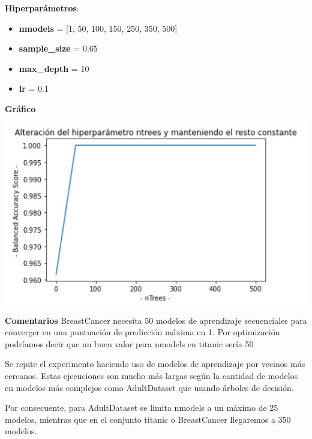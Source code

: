 \documentclass[conference,a4paper]{IEEEtran}
\begin{document}
\begin{textb}
    \textbf{Hiperparámetros}:
  \begin{itemize}
      \item \textbf{nmodels} = [1, 50, 100, 150, 250, 350, 500]
      \item \textbf{sample\_size} = 0.65
      \item \textbf{max\_depth} = 10
      \item \textbf{lr} = 0.1
  \end{itemize}
  \textbf{Gráfico}
  
  \begin{center}
    \includegraphics[scale=0.65]{figures/nmodels_BreastCancerDataset_trees.png}
    \label{fig:funcion_clasificacion}
  \end{center}
  
  \textbf{Comentarios} BreastCancer necesita 50 modelos de aprendizaje secuenciales para converger en una puntuación de predicción máxima en 1. Por optimización podríamos decir que un buen valor para nmodels en titanic sería 50
\end{textb}

Se repite el experimento haciendo uso de modelos de aprendizaje por vecinos más cercanos. Estas ejecuciones son mucho más largas según la cantidad de modelos en modelos más complejos como AdultDataset que usando árboles de decisión. 

Por consecuente, para AdultDataset se limita nmodels a un máximo de 25 modelos, mientras que en el conjunto titanic o BreastCancer llegaremos a 350 modelos.
\end{document}

